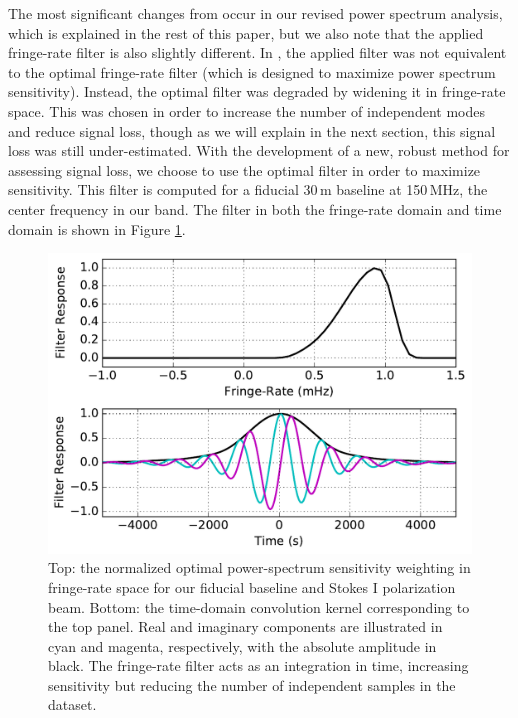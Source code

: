\documentclass[preprint2,numberedappendix,tighten]{aastex6}
\begin{document}
The most significant changes from  occur in our revised power spectrum analysis, which is explained in the rest of this paper, but we also note that the applied fringe-rate filter is also slightly different. In , the 
applied filter was not equivalent to the optimal fringe-rate filter (which is designed to maximize power spectrum sensitivity). Instead, the optimal filter was degraded by widening it in fringe-rate space. This was chosen in order to increase the number of independent 
modes and reduce signal loss, though as we will explain in the next section, this signal loss was still under-estimated. With the development of a new, 
robust method for assessing signal loss, we choose to use the optimal filter in order to maximize sensitivity. This filter is 
computed for a fiducial 30\,m baseline at 150\,MHz, the center frequency in our band. The filter in both the fringe-rate 
domain and time domain is shown in Figure \ref{fig:frp}.

\begin{figure}
	\centering
	\includegraphics[width=\columnwidth]{plots/frp.pdf}
	\caption{Top: the normalized optimal power-spectrum sensitivity weighting in fringe-rate space for our fiducial baseline and 
Stokes I polarization beam. Bottom: the time-domain convolution kernel corresponding to the top panel. Real and imaginary 
components are illustrated in cyan and magenta, respectively, with the absolute amplitude in black. The fringe-rate filter acts as 
an integration in time, increasing sensitivity but reducing the number of independent samples in the dataset.}
	\label{fig:frp}
\end{figure}
\end{document}
